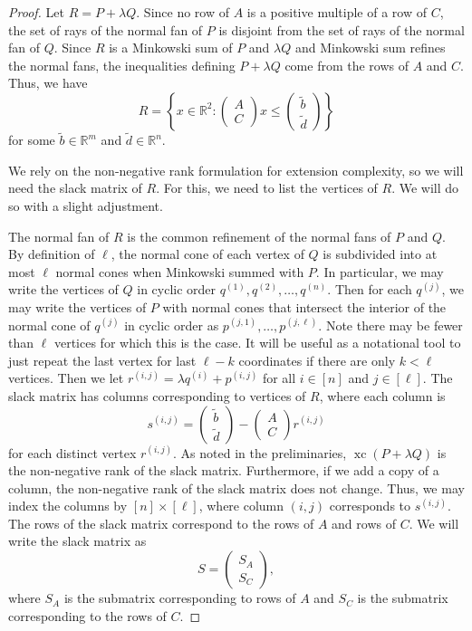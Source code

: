 \documentclass[centering,11pt,reqno]{amsart}
\theoremstyle{definition}
\DeclareMathOperator{\xc}{xc}
\begin{document}
\begin{proof}
 Let $R = P + \lambda Q$. Since no row of $A$ is a positive multiple of a row of $C$, the set of rays of the normal fan of $P$ is disjoint from the set of rays of the normal fan of $Q$. Since $R$ is a Minkowski sum of $P$ and $\lambda Q$ and Minkowski sum refines the normal fans, the inequalities defining $P+\lambda Q$ come from the rows of $A$ and $C$. Thus, we have
\[R = \left\{x \in \mathbb{R}^{2}: \begin{pmatrix} A \\ C\end{pmatrix} x \leq \begin{pmatrix} \tilde{b} \\ \tilde{d}\end{pmatrix}\right\}\]
for some $\tilde{b} \in \mathbb{R}^{m}$ and $\tilde{d} \in \mathbb{R}^{n}$. 

We rely on the non-negative rank formulation for extension complexity, so we will need the slack matrix of $R$. For this, we need to list the vertices of $R$. We will do so with a slight adjustment. 

The normal fan of $R$ is the common refinement of the normal fans of $P$ and $Q$. By definition of $\ell$, the normal cone of each vertex of $Q$ is subdivided into at most $\ell$ normal cones when Minkowski summed with $P$. In particular, we may write the vertices of $Q$ in cyclic order $q^{(1)}, q^{(2)}, \dots, q^{(n)}$. Then for each $q^{(j)}$, we may write the vertices of $P$ with normal cones that intersect the interior of the normal cone of $q^{(j)}$ in cyclic order as $p^{(j,1)}, \dots, p^{(j,\ell)}$. Note there may be fewer than $\ell$ vertices for which this is the case. It will be useful as a notational tool to just repeat the last vertex for last $\ell- k$ coordinates if there are only $k< \ell$ vertices. Then we let $r^{(i,j)} = \lambda q^{(i)} + p^{(i,j)}$ for all $i \in [n]$ and $j \in [\ell]$. The slack matrix has columns corresponding to vertices of $R$, where each column is 
\[s^{(i,j)} = \begin{pmatrix} \tilde{b} \\ \tilde{d}\end{pmatrix} -\begin{pmatrix} A \\C\end{pmatrix}r^{(i,j)}\] 
for each distinct vertex $r^{(i,j)}$. As noted in the preliminaries, $\xc(P+\lambda Q)$ is the non-negative rank of the slack matrix. Furthermore, if we add a copy of a column, the non-negative rank of the slack matrix does not change. Thus, we may index the columns by $[n] \times [\ell]$, where column $(i,j)$ corresponds to $s^{(i,j)}$. The rows of the slack matrix correspond to the rows of $A$ and rows of $C$. We will write the slack matrix as
\[S= \begin{pmatrix}S_{A} \\S_{C} \end{pmatrix},\]
where $S_{A}$ is the submatrix corresponding to rows of $A$ and $S_{C}$ is the submatrix corresponding to the rows of $C$.


\end{proof}
\end{document}
